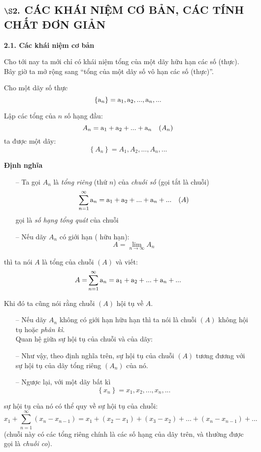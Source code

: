\documentclass[12pt,a4paper]{book}
\begin{document}
\begin{center}
\section*{\normalsize $\large\boldsymbol{\S 2. }$ CÁC KHÁI NIỆM CƠ BẢN, CÁC TÍNH CHẤT ĐƠN GIẢN}
\end{center}
\fontsize{14pt}{14pt}\selectfont%
\textbf{2.1. Các khái niệm cơ bản\\}
	\par Cho tới nay ta mới chỉ có khái niệm tổng của một dãy hữu hạn các số  (thực). Bây giờ ta mở rộng sang ``tổng của một dãy số vô hạn các số (thực)''.

	Cho một dãy số thực
\[\left\{ {{{\rm{a}}_n}} \right\} = {{\rm{a}}_1},{{\rm{a}}_2},...,{{\rm{a}}_n},...\]\par
	Lập các tổng của $n$ số hạng đầu:\\
\[{A_n} = {{\rm{a}}_1} + {{\rm{a}}_2} + ... + {{\rm{a}}_n}\quad(A_n)\]
ta được một dãy:
\[\left\{ {{A_n}} \right\} = {A_1},{A_2},...,{A_n},...\]
\par\textbf{Định nghĩa}
\begin{itemize}
\item[--] Ta gọi $A_n$ là \textit{tổng riêng} (thứ $n$) của \textit{chuỗi số} (gọi tắt là chuỗi)
\[\sum\limits_{n = 1}^\infty  {{{\rm{a}}_n}}  = {{\rm{a}}_1} + {{\rm{a}}_2} + ... + {{\rm{a}}_n} + ... \quad (A)\]
gọi là \textit{số hạng tổng quát} của chuỗi
\item[--] Nếu dãy ${A_n}$ có giới hạn ( hữu hạn):
\[A = \mathop {\lim }\limits_{n \to \infty } {A_n}\]
\end{itemize}
thì ta nói $A$ là tổng của chuỗi $(A)$ và viết:
\[{A = }\sum\limits_{n = 1}^\infty  {{{\rm{a}}_n}}  = {{\rm{a}}_1} + {{\rm{a}}_2} + ... + {{\rm{a}}_n} + ...\]

Khi đó ta cũng nói rằng chuỗi $(A)$ hội tụ về $A$.
\begin{itemize}
\item[--] Nếu dãy ${A_n}$ không có giới hạn hữu hạn thì ta nói là chuỗi $(A)$ không hội tụ hoặc \textit{phân kì}.\\

Quan hệ giữa sự hội tụ của chuỗi và của dãy:
\item[--] Như vậy, theo định nghĩa trên, sự hội tụ của chuỗi $(A)$ tương đương với sự hội tụ của dãy tổng riêng $(A_n)$ của nó.
\item[--] Ngược lại, với một dãy bất kì
\[\left\{ {{x_n}} \right\} = {x_1},{x_2},...,{x_n},...\]
\end{itemize}
sự hội tụ của nó có thể quy về sự hội tụ của chuỗi:
\[{x_1} + \sum\limits_{n = 1}^\infty  {({x_n} - {x_{n - 1}})}  = {x_1} + ({x_2} - {x_1}) + ({x_3} - {x_2}) + ... + ({x_n} - {x_{n - 1}}) + ...\]
(chuỗi này có các tổng riêng chính là các số hạng của dãy trên, và thường được gọi là \textit{chuỗi co}).
\end{document}
